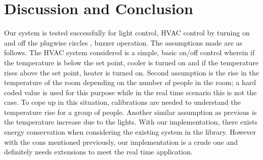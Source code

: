 \documentclass[runningheads]{llncs}
\begin{document}
\section{Discussion and Conclusion}
Our system is tested successfully for light control, HVAC control by turning on and off the plugwise circles , buzzer operation. The assumptions made are as follows. The HVAC system considered is a simple, basic on/off control wherein if the temperature is below the set point, cooler is turned on and if the temperature rises above the set point, heater is turned on. Second assumption is the rise in the temperature of the room depending on the number of people in the room; a hard coded value is used for this purpose while in the real time scenario this is not the case. To cope up in this situation, calibrations are needed to understand the temperature rise for a group of people. Another similar assumption as previous is the temperature increase due to the lights. With our implementation, there exists energy conservation when considering the existing system in the library. However with the cons mentioned previously, our implementation is a crude one and definitely needs extensions to meet the real time application. 

%
%


\end{document}
